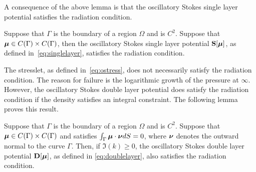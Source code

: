 A consequence of the above lemma is that the oscillatory Stokes
single layer potential satisfies the radiation condition.
\begin{corollary}
Suppose that $\Gamma$ is the boundary of a region $\Omega$
and is $C^{2}$. 
Suppose that ${\boldsymbol \mu} \in C(\Gamma)\times C(\Gamma)$, then
the oscillatory Stokes single layer potential ${\bf S}[{\boldsymbol \mu}]$,
as defined in~\cref{eq:singlelayer}, satisfies the radiation condition.
\end{corollary}
The stresslet, as defined in~\cref{eq:ostress}, 
does not necessarily satisfy the radiation condition.
The reason for failure is the logarithmic growth of 
the pressure at $\infty$.
However, the oscillatory Stokes double layer potential
does satisfy the radiation condition 
if the density satisfies an integral constraint.
The following lemma proves this result.

\begin{lemma}
Suppose that $\Gamma$ is the boundary of a region $\Omega$
and is $C^{2}$. 
Suppose that ${\boldsymbol \mu} \in C(\Gamma) \times C(\Gamma)$ and satisfies
$\int_{\Gamma} {\boldsymbol \mu} \cdot {\boldsymbol \nu} dS = 0$, where
${\boldsymbol \nu}$ denotes the outward normal to the curve $\Gamma$.
Then, {\color{red} if $\Im (k) \geq 0$}, the oscillatory Stokes 
double layer potential ${\bf D}[{\boldsymbol \mu}]$, as defined in
\eqref{eq:doublelayer}, also satisfies the radiation
condition.
\end{lemma}

